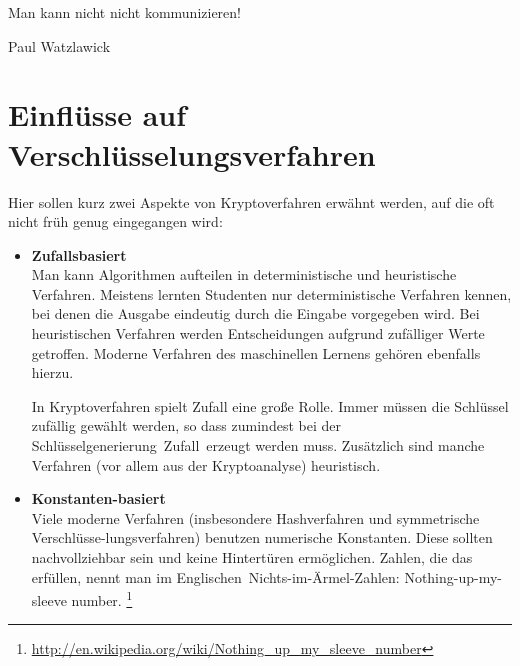 \newpage

\begin{ctsquote}
\glqq Man kann nicht nicht kommunizieren!\grqq 
\caption[Paul Watzlawick]{Paul Watzlawick\footnotemark}
\end{ctsquote}
\addtocounter{footnote}{0}

\section[Einflüsse auf Verschlüsselungsverfahren] %
{Einflüsse auf Verschlüsselungsverfahren}

Hier sollen kurz zwei Aspekte von Kryptoverfahren erwähnt werden, auf die oft nicht früh genug eingegangen wird:

\begin{itemize}

\item {\bfseries  Zufallsbasiert}\\
Man kann Algorithmen aufteilen in deterministische und heuristische Verfahren. Meistens lernten Studenten nur deterministische Verfahren kennen, bei denen die Ausgabe eindeutig durch die Eingabe vorgegeben wird. Bei heuristischen Verfahren werden Entscheidungen aufgrund zufälliger Werte getroffen. Moderne Verfahren des maschinellen Lernens gehören ebenfalls hierzu.

In Kryptoverfahren spielt Zufall eine große Rolle. Immer müssen die Schlüssel zufällig gewählt werden, so dass zumindest bei der Schlüsselgenerierung~\glqq Zufall\grqq~erzeugt werden muss. Zusätzlich sind manche Verfahren (vor allem aus der Kryptoanalyse) heuristisch.

\item {\bfseries Konstanten-basiert}\\
Viele moderne Verfahren (insbesondere Hashverfahren und symmetrische Verschlüsse-lungsverfahren) benutzen numerische Konstanten. Diese sollten nachvollziehbar sein und keine Hintertüren ermöglichen. Zahlen, die das erfüllen, nennt man im Englischen~\glqq Nichts-im-Ärmel\grqq-Zahlen: Nothing-up-my-sleeve number.%
\footnote{\url{http://en.wikipedia.org/wiki/Nothing_up_my_sleeve_number}}

\end{itemize}


